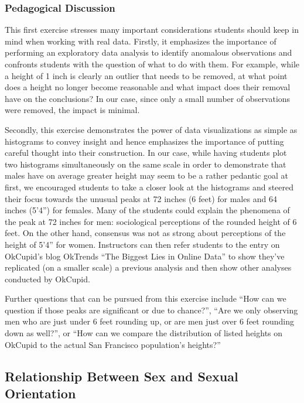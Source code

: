 \documentclass{article}\usepackage[]{graphicx}\usepackage[]{color}
\begin{document}
\subsubsection{Pedagogical Discussion}
This first exercise stresses many important considerations students should keep in mind when working with real data.  Firstly, it emphasizes the importance of performing an exploratory data analysis to identify anomalous observations and confronts students with the question of what to do with them.  For example, while a height of 1 inch is clearly an outlier that needs to be removed, at what point does a height no longer become reasonable and what impact does their removal have on the conclusions?  In our case, since only a small number of observations were removed, the impact is minimal.

Secondly, this exercise demonstrates the power of data visualizations as simple as histograms to convey insight and hence emphasizes the importance of putting careful thought into their construction.  In our case, while having students plot two histograms simultaneously on the same scale in order to demonstrate that males have on average greater height may seem to be a rather pedantic goal at first, we encouraged students to take a closer look at the histograms and steered their focus towards the unusual peaks at 72 inches (6 feet) for males and 64 inches (5'4'') for females.  Many of the students could explain the phenomena of the peak at 72 inches for men: sociological perceptions of the rounded height of 6 feet.  On the other hand, consensus was not as strong about perceptions of the height of 5'4'' for women.  Instructors can then refer students to the entry on OkCupid's blog OkTrends ``The Biggest Lies in Online Data''\cite{OkTrendsLies} to show they've replicated (on a smaller scale) a previous analysis and then show other analyses conducted by OkCupid.

Further questions that can be pursued from this exercise include ``How can we question if those peaks are significant or due to chance?'', ``Are we only observing men who are just under 6 feet rounding up, or are men just over 6 feet rounding down as well?'', or ``How can we compare the distribution of listed heights on OkCupid to the actual San Francisco population's heights?''







\subsection{Relationship Between Sex and Sexual Orientation}\label{sex_by_sexual_orientation}
\end{document}
